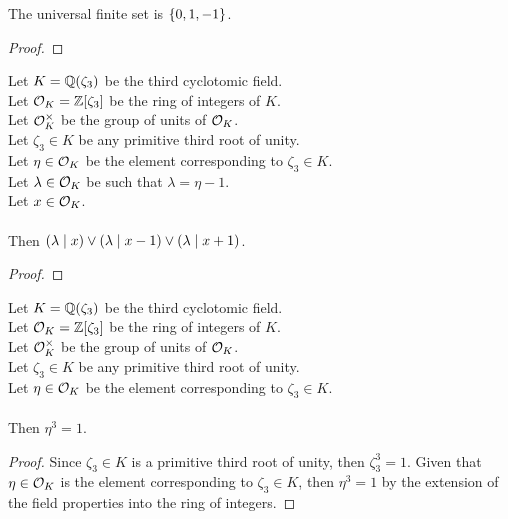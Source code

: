 \begin{lemma}
    \label{lmm:univ_quot}
    \leanok
    The universal finite set is $\left\{0, 1, -1\right\}$.
\end{lemma}
\begin{proof}
    \leanok
\end{proof}

\begin{lemma}
    \label{lmm:dvd_or_dvd_sub_one_or_dvd_add_one}
    \leanok
    Let $K = \mathbb{Q}(\zeta_3)$ be the third cyclotomic field. \\
    Let $\mathcal{O}_K = \mathbb{Z}[\zeta_3]$ be the ring of integers of $K$. \\
    Let $\mathcal{O}^\times_K$ be the group of units of $\mathcal{O}_K$. \\
    Let $\zeta_3 \in K$ be any primitive third root of unity. \\
    Let $\eta \in \mathcal{O}_K$ be the element corresponding to $\zeta_3 \in K$. \\
    Let $\lambda \in \mathcal{O}_K$ be such that $\lambda = \eta -1$. \\
    Let $x \in \mathcal{O}_K$. \\\\
    Then $(\lambda \mid x) \lor (\lambda \mid x-1) \lor (\lambda \mid x+1)$.
\end{lemma}
\begin{proof}
    \leanok
\end{proof}

\begin{lemma}
    \label{lmm:toInteger_cube_eq_one}
    \leanok
    Let $K = \mathbb{Q}(\zeta_3)$ be the third cyclotomic field. \\
    Let $\mathcal{O}_K = \mathbb{Z}[\zeta_3]$ be the ring of integers of $K$. \\
    Let $\mathcal{O}^\times_K$ be the group of units of $\mathcal{O}_K$. \\
    Let $\zeta_3 \in K$ be any primitive third root of unity. \\
    Let $\eta \in \mathcal{O}_K$ be the element corresponding to $\zeta_3 \in K$. \\\\
    Then $\eta^3 = 1$.
\end{lemma}
\begin{proof}
    \leanok
    Since $\zeta_3 \in K$ is a primitive third root of unity, then $\zeta_3^3 = 1$.
    Given that $\eta \in \mathcal{O}_K$ is the element corresponding to $\zeta_3 \in K$, then
    $\eta^3 = 1$ by the extension of the field properties into the ring of integers.
\end{proof}

